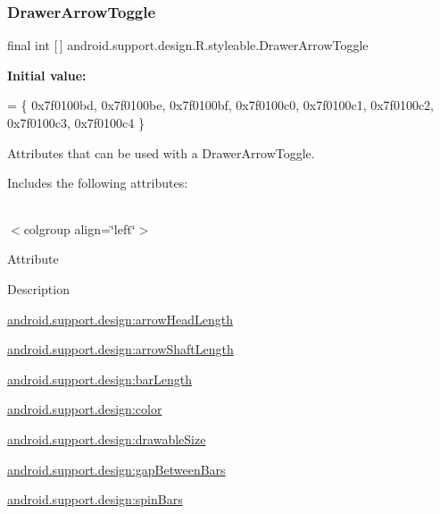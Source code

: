 \subsubsection{\texorpdfstring{Drawer\+Arrow\+Toggle}{DrawerArrowToggle}}
{\footnotesize\ttfamily final int \mbox{[}$\,$\mbox{]} android.\+support.\+design.\+R.\+styleable.\+Drawer\+Arrow\+Toggle\hspace{0.3cm}{\ttfamily [static]}}

{\bfseries Initial value\+:}
\begin{DoxyCode}
= \{
            0x7f0100bd, 0x7f0100be, 0x7f0100bf, 0x7f0100c0,
            0x7f0100c1, 0x7f0100c2, 0x7f0100c3, 0x7f0100c4
        \}
\end{DoxyCode}
Attributes that can be used with a Drawer\+Arrow\+Toggle. 

Includes the following attributes\+:

\tabulinesep=1mm
\begin{longtabu} spread 0pt [c]{*{0}{|X[-1]}|}
\hline
\end{longtabu}
$<$colgroup align=\char`\"{}left\char`\"{}$>$ 

Attribute

Description 

{\ttfamily \hyperlink{classandroid_1_1support_1_1design_1_1R_1_1styleable_a04d4c9dc68578489d0d401c435684cfb}{android.\+support.\+design\+:arrow\+Head\+Length}}

{\ttfamily \hyperlink{classandroid_1_1support_1_1design_1_1R_1_1styleable_a2dca38b895260aa31773fd2f7f247438}{android.\+support.\+design\+:arrow\+Shaft\+Length}}

{\ttfamily \hyperlink{classandroid_1_1support_1_1design_1_1R_1_1styleable_ae52627e17694eb02d691f0e5d355fb74}{android.\+support.\+design\+:bar\+Length}}

{\ttfamily \hyperlink{classandroid_1_1support_1_1design_1_1R_1_1styleable_a95f1e87753ba4cd62fef03f1b2635ba1}{android.\+support.\+design\+:color}}

{\ttfamily \hyperlink{classandroid_1_1support_1_1design_1_1R_1_1styleable_aa82a02d1c0ba82c43692ec349fddcea0}{android.\+support.\+design\+:drawable\+Size}}

{\ttfamily \hyperlink{classandroid_1_1support_1_1design_1_1R_1_1styleable_aa48d199f2cd1185a5c6a23528050d749}{android.\+support.\+design\+:gap\+Between\+Bars}}

{\ttfamily \hyperlink{classandroid_1_1support_1_1design_1_1R_1_1styleable_a927e817de79212ffbefd47a7d4fb1a1e}{android.\+support.\+design\+:spin\+Bars}}

